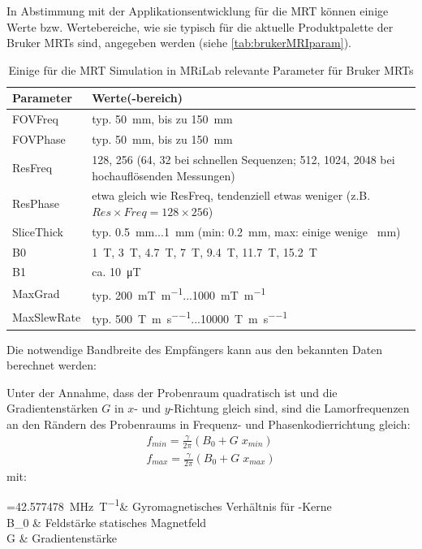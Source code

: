 In Abstimmung mit der Applikationsentwicklung für die MRT können einige Werte bzw. Wertebereiche, wie sie typisch für die aktuelle Produktpalette der Bruker MRTs sind, angegeben werden (siehe \autoref{tab:brukerMRIparam}). 

\begin{table}[H]
	\centering
	\caption[Bruker MRT Simulationsparameter]{Einige für die MRT Simulation in MRiLab relevante Parameter für Bruker MRTs}
	\label{tab:brukerMRIparam}
	\begin{tabularx}{\textwidth}{lX}
		\toprule
		\textbf{Parameter} & \textbf{Werte(-bereich)}\\
		\midrule
		FOVFreq    & typ. \SI{50}{\mm}, bis zu \SI{150}{\mm}\\
		FOVPhase   & typ. \SI{50}{\mm}, bis zu \SI{150}{\mm}\\
		ResFreq    & 128, 256 (64, 32 bei schnellen Sequenzen; 512, 1024, 2048 bei hochauflösenden Messungen)\\
		ResPhase   & etwa gleich wie ResFreq, tendenziell etwas weniger (z.B. $Res \times Freq=128\times256$)\\
		SliceThick & typ. \SI{0.5}{\mm}...\SI{1}{\mm} (min: \SI{0.2}{\mm}, max: einige wenige \SI{}{\mm})\\
		B0         & \SI{1}{\tesla}, \SI{3}{\tesla}, \SI{4.7}{\tesla}, \SI{7}{\tesla}, \SI{9.4}{\tesla}, \SI{11.7}{\tesla}, \SI{15.2}{\tesla} \\
		B1         & ca. \SI{10}{\micro\tesla}\\
		MaxGrad    & typ. \SI{200}{\milli\tesla\per\m}...\SI{1000}{\milli\tesla\per\m}\\
		MaxSlewRate& typ. \SI{500}{\tesla\per\m\per\s}...\SI{10000}{\tesla\per\m\per\s}\\
		\bottomrule
	\end{tabularx}
\end{table}

Die notwendige Bandbreite des Empfängers kann aus den bekannten Daten berechnet werden:

Unter der Annahme, dass der Probenraum quadratisch ist und die Gradientenstärken $G$ in $x$- und $y$-Richtung gleich sind, sind die Lamorfrequenzen an den Rändern des Probenraums in Frequenz- und Phasenkodierrichtung gleich:
\begin{subequations}
	\begin{align}
	f_{min}=\frac{\gamma}{2\pi} (B_0+G\; x_{min}) \\
	f_{max}=\frac{\gamma}{2\pi} (B_0+G\; x_{max})
	\end{align}
\end{subequations}
mit:
\begin{with}
	\frac{\gamma}{2\pi} =\SI{42.577478}{\mega\hertz\per\tesla}& Gyromagnetisches Verhältnis für -Kerne \\
	B_0  & Feldstärke statisches Magnetfeld \\
	G  & Gradientenstärke \\
\end{with}

